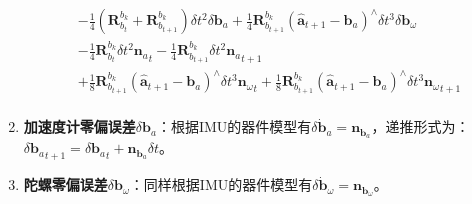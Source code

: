 \begin{enumerate}
\begin{equation}
\begin{aligned}
	&-\frac{1}{4}\left(\bm{R}_{b_t}^{b_k}+\bm{R}_{b_{t+1}}^{b_k}\right)\delta t^2\delta\bm{b}_a+\frac{1}{4}\bm{R}_{b_{t+1}}^{b_k}\left(\hat{\bm{a}}_{t+1}-\bm{b}_a\right)^\wedge\delta t^3\delta\bm{b}_\omega\\
	&-\frac{1}{4}\bm{R}_{b_t}^{b_k}\delta t^2{\bm{n}_a}_t-\frac{1}{4}\bm{R}_{b_{t+1}}^{b_k}\delta t^2{\bm{n}_a}_{t+1}\\
	&+\frac{1}{8}\bm{R}_{b_{t+1}}^{b_k}\left(\hat{\bm{a}}_{t+1}-\bm{b}_a\right)^\wedge\delta t^3{\bm{n}_\omega}_t+\frac{1}{8}\bm{R}_{b_{t+1}}^{b_k}\left(\hat{\bm{a}}_{t+1}-\bm{b}_a\right)^\wedge\delta t^3{\bm{n}_\omega}_{t+1}\\
	\end{aligned}
	\end{equation}	
	
	\item \textbf{加速度计零偏误差}$\delta\bm{b}_a$：根据IMU的器件模型有$\delta\dot{\bm{b}}_a=\bm{n}_{\bm{b}_a}$，递推形式为：
	${\delta\bm{b}_a}_{t+1}={\delta\bm{b}_a}_t+\bm{n}_{\bm{b}_a}\delta t$。
	\item \textbf{陀螺零偏误差}$\delta\bm{b}_\omega$：同样根据IMU的器件模型有$\delta\dot{\bm{b}}_\omega=\bm{n}_{\bm{b}_\omega}$。
	

\end{enumerate}
